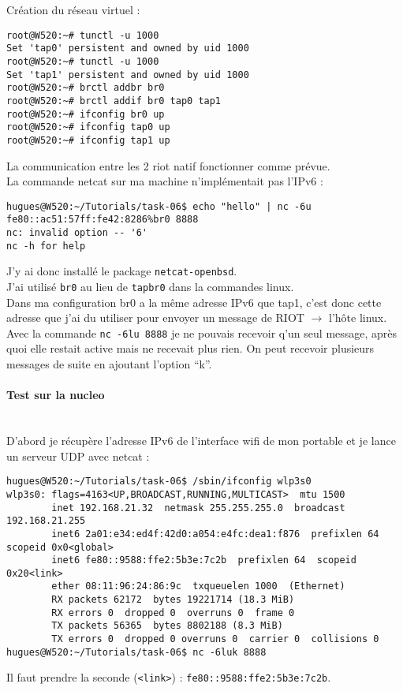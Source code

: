 Création du réseau virtuel :
\begin{verbatim}
root@W520:~# tunctl -u 1000
Set 'tap0' persistent and owned by uid 1000
root@W520:~# tunctl -u 1000
Set 'tap1' persistent and owned by uid 1000
root@W520:~# brctl addbr br0
root@W520:~# brctl addif br0 tap0 tap1
root@W520:~# ifconfig br0 up
root@W520:~# ifconfig tap0 up
root@W520:~# ifconfig tap1 up
\end{verbatim}

La communication entre les 2 riot natif fonctionner comme prévue.\\

La commande netcat sur ma machine n'implémentait pas l'IPv6 :
{\footnotesize
\begin{verbatim}
hugues@W520:~/Tutorials/task-06$ echo "hello" | nc -6u fe80::ac51:57ff:fe42:8286%br0 8888
nc: invalid option -- '6'
nc -h for help
\end{verbatim}
}
J'y ai donc installé le package \texttt{netcat-openbsd}.\\

J'ai utilisé \texttt{br0} au lieu de \texttt{tapbr0} dans la commandes
linux.\\

Dans ma configuration br0 a la même adresse IPv6 que tap1, c'est donc
cette adresse que j'ai du utiliser pour envoyer un message de RIOT 
$\rightarrow$ l'hôte linux.\\

Avec la commande \texttt{nc -6lu 8888} je ne pouvais recevoir q'un seul
message, après quoi elle restait active mais ne recevait plus rien. On
peut recevoir plusieurs messages de suite en ajoutant l'option
\enquote{k}.\\

\paragraph{Test sur la nucleo\\\\}
D'abord je récupère l'adresse IPv6 de l'interface wifi de mon portable 
et je lance un serveur UDP avec netcat :
{\scriptsize
\begin{verbatim}
hugues@W520:~/Tutorials/task-06$ /sbin/ifconfig wlp3s0
wlp3s0: flags=4163<UP,BROADCAST,RUNNING,MULTICAST>  mtu 1500
        inet 192.168.21.32  netmask 255.255.255.0  broadcast 192.168.21.255
        inet6 2a01:e34:ed4f:42d0:a054:e4fc:dea1:f876  prefixlen 64  scopeid 0x0<global>
        inet6 fe80::9588:ffe2:5b3e:7c2b  prefixlen 64  scopeid 0x20<link>
        ether 08:11:96:24:86:9c  txqueuelen 1000  (Ethernet)
        RX packets 62172  bytes 19221714 (18.3 MiB)
        RX errors 0  dropped 0  overruns 0  frame 0
        TX packets 56365  bytes 8802188 (8.3 MiB)
        TX errors 0  dropped 0 overruns 0  carrier 0  collisions 0
hugues@W520:~/Tutorials/task-06$ nc -6luk 8888
\end{verbatim}
}
Il faut prendre la seconde (\texttt{<link>}) : 
\texttt{fe80::9588:ffe2:5b3e:7c2b}.\\

